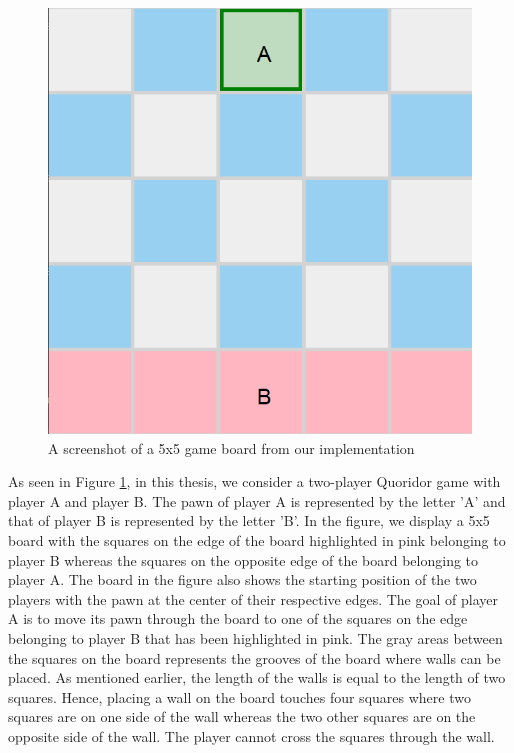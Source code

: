 \begin{figure}[!ht]
    \centering
    \includegraphics[scale=0.25]{../img/GameBoard/initial.png}
    \caption{A screenshot of a 5x5 game board from our implementation}
    \label{fig:InitialGameBoard}
\end{figure}

As seen in Figure \ref{fig:InitialGameBoard}, in this thesis, we consider a two-player Quoridor game with player A and player B. The pawn of player A is represented by the letter 'A' and that of player B is represented by the letter 'B'. In the figure, we display a 5x5 board with the squares on the edge of the board highlighted in pink belonging to player B whereas the squares on the opposite edge of the board belonging to player A. The board in the figure also shows the starting position of the two players with the pawn at the center of their respective edges. The goal of player A is to move its pawn through the board to one of the squares on the edge belonging to player B that has been highlighted in pink. The gray areas between the squares on the board represents the grooves of the board where walls can be placed. As mentioned earlier, the length of the walls is equal to the length of two squares. Hence, placing a wall on the board touches four squares where two squares are on one side of the wall whereas the two other squares are on the opposite side of the wall. The player cannot cross the squares through the wall. 

